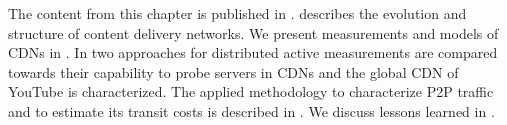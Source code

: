 The content from this chapter is published in \cite{burger2012profit,burger2014vantage,burger2016hierarchical}.
 describes the evolution and structure of content delivery networks.
We present measurements and models of CDNs in .
In  two approaches for distributed active measurements are compared towards their capability to probe servers in CDNs and the global CDN of YouTube is characterized.
The applied methodology to characterize P2P traffic and to estimate its transit costs is described in .
We discuss lessons learned in .





%

